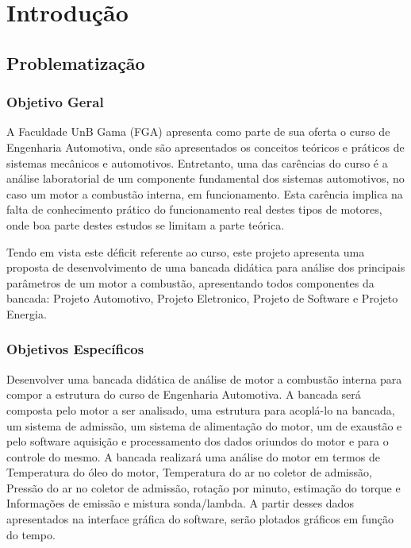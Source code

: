 \chapter[Introdução]{Introdução}

\section{Problematização}

\subsection{Objetivo Geral}

A Faculdade UnB Gama (FGA) apresenta como parte de sua oferta o curso de Engenharia Automotiva, onde são apresentados os conceitos teóricos e práticos de sistemas mecânicos e automotivos. Entretanto, uma das carências do curso é a análise laboratorial de um componente fundamental dos sistemas automotivos, no caso um motor a combustão interna, em funcionamento. Esta carência implica na falta de conhecimento prático do funcionamento real destes tipos de motores, onde boa parte destes estudos se limitam a parte teórica.

Tendo em vista este déficit referente ao curso, este projeto apresenta uma proposta de desenvolvimento de uma bancada didática para análise dos principais parâmetros de um motor a combustão, apresentando todos componentes da bancada: Projeto Automotivo, Projeto Eletronico, Projeto de Software e Projeto Energia.

\subsection{Objetivos Específicos}

Desenvolver uma bancada didática de análise de motor a combustão interna para compor a estrutura do curso de Engenharia Automotiva. A bancada será composta pelo motor a ser analisado, uma estrutura para acoplá-lo na bancada, um sistema de admissão, um sistema de alimentação do motor, um de exaustão e pelo software aquisição e processamento dos dados oriundos do motor e para o controle do mesmo. A bancada realizará uma análise do motor em termos de Temperatura do óleo do motor, Temperatura do ar no coletor de admissão, Pressão do ar no coletor de admissão, rotação por minuto, estimação do torque e Informações de emissão e mistura sonda/lambda. A partir desses dados apresentados na interface gráfica do software, serão plotados gráficos em função do tempo.

